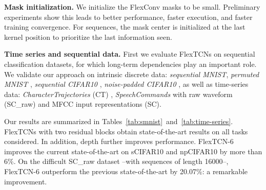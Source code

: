 \documentclass{article} \usepackage{iclr2022_conference,times}
\begin{document}
\textbf{Mask initialization.} We initialize the FlexConv masks to be small. Preliminary experiments show this leads to better performance, faster execution, and faster training convergence. For sequences, the mask center is initialized at the last kernel position to prioritize the last information seen.

\textbf{Time series and sequential data.} First we evaluate FlexTCNs on sequential classification datasets, for which long-term dependencies play an important role. 
We validate our approach on intrinsic discrete data: \textit{sequential MNIST}, \textit{permuted MNIST} \citep{le2015simple}, \textit{sequential CIFAR10} \citep{chang2017dilated}, \textit{noise-padded CIFAR10} \citep{chang2019antisymmetricrnn}, as well as time-series data: \textit{CharacterTrajectories} (CT) \citep{bagnall2018uea}, \textit{SpeechCommands} \citep{warden2018speech} with raw waveform (SC\_raw) and MFCC input representations (SC).

Our results are summarized in Tables~\ref{tab:smnist}~and~\ref{tab:time-series}. FlexTCNs with two residual blocks obtain state-of-the-art results on all tasks considered. In addition, depth further improves performance. FlexTCN-6 improves the current state-of-the-art on sCIFAR10 and npCIFAR10 by more than 6\%. On the difficult SC\_raw dataset --with sequences of length 16000--, FlexTCN-6 outperform the previous state-of-the-art by 20.07\%: a remarkable improvement.
\end{document}
